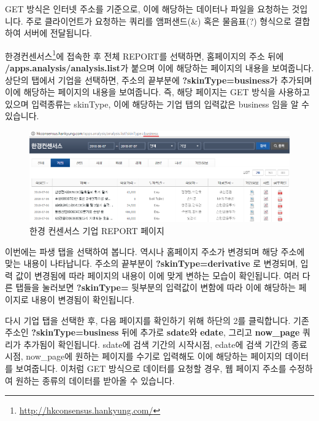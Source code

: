 \documentclass[]{book}
\let\rmarkdownfootnote\footnote%
\def\footnote{\protect\rmarkdownfootnote}
\begin{document}
GET 방식은 인터넷 주소를 기준으로, 이에 해당하는 데이터나 파일을 요청하는 것입니다. 주로 클라이언트가 요청하는 쿼리를 앰퍼샌드(\&) 혹은 물음표(?) 형식으로 결합하여 서버에 전달됩니다.

한경컨센서스\footnote{\url{http://hkconsensus.hankyung.com/}}에 접속한 후 전체 REPORT를 선택하면, 홈페이지의 주소 뒤에 \textbf{/apps.analysis/analysis.list}가 붙으며 이에 해당하는 페이지의 내용을 보여줍니다. 상단의 탭에서 기업을 선택하면, 주소의 끝부분에 \textbf{?skinType=business}가 추가되며 이에 해당하는 페이지의 내용을 보여줍니다. 즉, 해당 페이지는 GET 방식을 사용하고 있으며 입력종류는 skinType, 이에 해당하는 기업 탭의 입력값은 business 임을 알 수 있습니다.

\begin{figure}

{\centering \includegraphics[width=1\linewidth]{images/crawl_hk} 

}

\caption{한경 컨센서스 기업 REPORT 페이지}\label{fig:unnamed-chunk-2}
\end{figure}

이번에는 파생 탭을 선택하여 봅니다. 역시나 홈페이지 주소가 변경되며 해당 주소에 맞는 내용이 나타납니다. 주소의 끝부분이 \textbf{?skinType=derivative} 로 변경되며, 입력 값이 변경됨에 따라 페이지의 내용이 이에 맞게 변하는 모습이 확인됩니다. 여러 다른 탭들을 눌러보면 \textbf{?skinType=} 뒷부분의 입력값이 변함에 따라 이에 해당하는 페이지로 내용이 변경됨이 확인됩니다.

다시 기업 탭을 선택한 후, 다음 페이지를 확인하기 위해 하단의 2를 클릭합니다. 기존 주소인 \textbf{?skinType=business} 뒤에 추가로 \textbf{sdate}와 \textbf{edate}, 그리고 \textbf{now\_page} 쿼리가 추가됨이 확인됩니다. sdate에 검색 기간의 시작시점, edate에 검색 기간의 종료시점, now\_page에 원하는 페이지를 수기로 입력해도 이에 해당하는 페이지의 데이터를 보여줍니다. 이처럼 GET 방식으로 데이터를 요청할 경우, 웹 페이지 주소를 수정하여 원하는 종류의 데이터를 받아올 수 있습니다.
\end{document}
